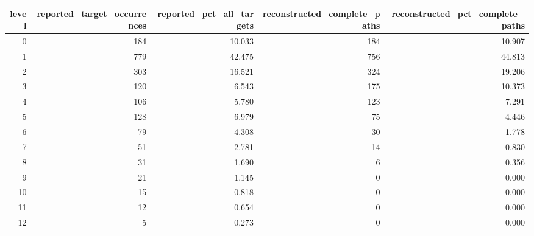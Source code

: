 \begin{tabular}{rrrrr}
\toprule
level & reported\_target\_occurrences & reported\_pct\_all\_targets & reconstructed\_complete\_paths & reconstructed\_pct\_complete\_paths \\
\midrule
0 & 184 & 10.033 & 184 & 10.907 \\
1 & 779 & 42.475 & 756 & 44.813 \\
2 & 303 & 16.521 & 324 & 19.206 \\
3 & 120 & 6.543 & 175 & 10.373 \\
4 & 106 & 5.780 & 123 & 7.291 \\
5 & 128 & 6.979 & 75 & 4.446 \\
6 & 79 & 4.308 & 30 & 1.778 \\
7 & 51 & 2.781 & 14 & 0.830 \\
8 & 31 & 1.690 & 6 & 0.356 \\
9 & 21 & 1.145 & 0 & 0.000 \\
10 & 15 & 0.818 & 0 & 0.000 \\
11 & 12 & 0.654 & 0 & 0.000 \\
12 & 5 & 0.273 & 0 & 0.000 \\
\bottomrule
\end{tabular}
